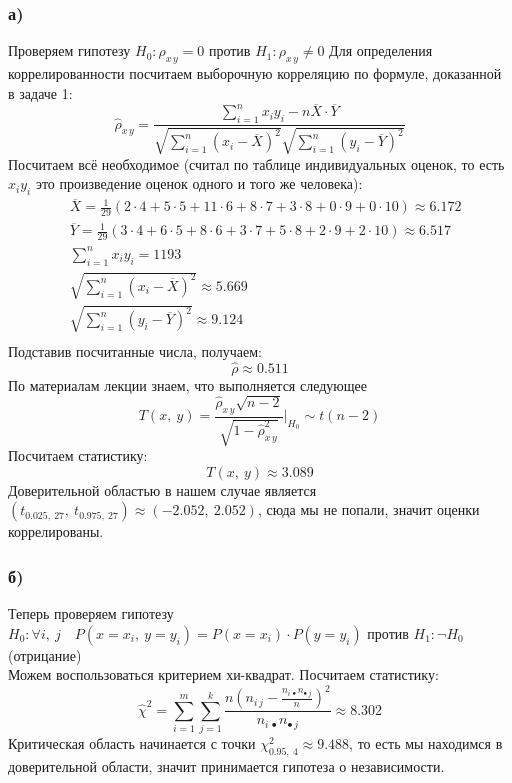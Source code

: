 \documentclass[12pt, a4paper]{article}
\begin{document}
\subsubsection*{а)}
Проверяем гипотезу $H_0: \rho_{x\, y} = 0$ против $H_1: \rho_{x\, y} \neq 0$
Для определения коррелированности посчитаем выборочную корреляцию по формуле, доказанной в задаче 1:
\[
\hat \rho_{x\, y} = \frac{\sum_{i = 1}^{n} x_i y_i - n \overline{X}\cdot \overline{Y}}{ \sqrt{\sum_{i = 1}^{n} {\left( x_i - \overline{X} \right)}^2 } \sqrt{\sum_{i = 1}^{n} {\left( y_i - \overline{Y} \right)}^2 } }
\]
Посчитаем всё необходимое (считал по таблице индивидуальных оценок, то есть $x_i y_i$ это произведение оценок одного и того же человека):
\begin{equation*}
    \begin{aligned}
        & \overline{X} = \frac{1}{29} \left( 2\cdot 4 + 5\cdot 5 + 11\cdot 6 + 8 \cdot 7 + 3 \cdot 8 + 0 \cdot 9 + 0 \cdot 10 \right) \approx 6.172 \\
        & \overline{Y} = \frac{1}{29} \left( 3\cdot 4 + 6\cdot 5 + 8\cdot 6 + 3 \cdot 7 + 5\cdot 8 + 2 \cdot 9 + 2 \cdot 10 \right) \approx 6.517\\
        & \sum_{i = 1}^{n} x_i y_i = 1193\\
        & \sqrt{\sum_{i = 1}^{n} {\left( x_i - \overline{X} \right)}^2} \approx 5.669\\
        & \sqrt{\sum_{i = 1}^{n} {\left( y_i - \overline{Y} \right)}^2} \approx 9.124\\
    \end{aligned}
\end{equation*}
Подставив посчитанные числа, получаем:
\[
\hat \rho \approx 0.511
\]
По материалам лекции знаем, что выполняется следующее
\[
T(x,\ y) = \frac{\hat \rho_{x\, y} \sqrt{n - 2} }{\sqrt{1 - \hat \rho^2_{x\, y}}} \Bigg|_{H_0} \sim t(n - 2)
\]
Посчитаем статистику:
\[
T(x,\ y) \approx 3.089
\]
Доверительной областью в нашем случае является $(t_{0.025,\ 27},\ t_{0.975,\ 27}) \approx (-2.052,\ 2.052)$, сюда мы не попали, значит оценки коррелированы.\\
\subsubsection*{б)}
Теперь проверяем гипотезу $H_0: \forall i,\ j\quad P(x = x_i,\ y = y_i) = P(x = x_i) \cdot P(y = y_i)$ против $H_1: \neg H_0$ (отрицание)\\
Можем воспользоваться критерием хи-квадрат. Посчитаем статистику:
\[
    \hat \chi^2 = \sum_{i = 1}^{m} \sum_{j = 1}^{k} \frac{ n {\left( n_{i\, j} - \frac{n_{i\, \bullet} n_{\bullet\, j}}{n} \right)}^2 }{ n_{i\, \bullet} n_{\bullet\, j} } \approx 8.302
\]
Критическая область начинается с точки $\chi^2_{0.95,\ 4} \approx 9.488$, то есть мы находимся в доверительной области, значит принимается гипотеза о независимости.
\end{document}
